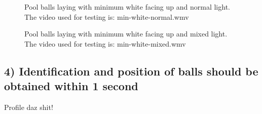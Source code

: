 \begin{figure}[H]
  \centering
  \quad
	\quad
   \caption{Pool balls laying with minimum white facing up and normal light. The video used for testing is: min-white-normal.wmv}
  \label{fig:minnormal}
\end{figure}


\begin{figure}[H]
  \centering
  \quad
  \quad
   \caption{Pool balls laying with minimum white facing up and mixed light. The video used for testing is: min-white-mixed.wmv}
  \label{fig:minmixed}
\end{figure}


\subsection{4) Identification and position of balls should be obtained within 1 second}

Profile daz shit!
